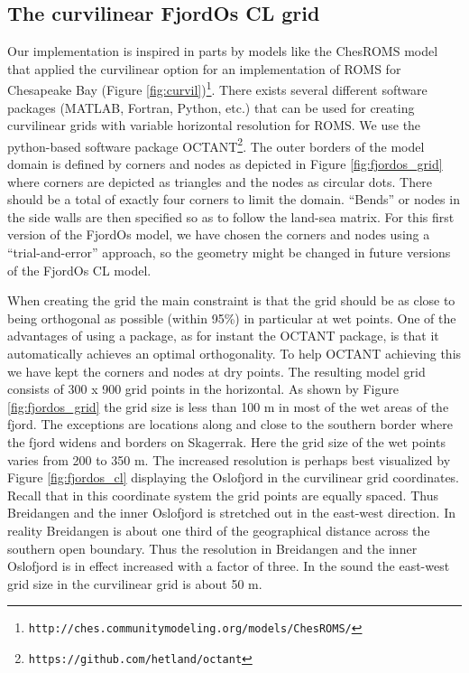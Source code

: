 \subsection{The curvilinear FjordOs CL grid}
Our implementation is inspired in parts by models like the ChesROMS model that applied the curvilinear option for an implementation of ROMS for Chesapeake Bay (Figure \ref{fig:curvil})\footnote{\texttt{http://ches.communitymodeling.org/models/ChesROMS/}}. There exists several different software packages (MATLAB, Fortran, Python, etc.) that can be used for creating curvilinear grids with variable horizontal resolution for ROMS. We use the python-based software package OCTANT\footnote{\texttt{https://github.com/hetland/octant}}. The outer borders of the model domain is defined by corners and nodes as depicted in Figure \ref{fig:fjordos_grid} where corners are depicted as triangles and the nodes as circular dots. There should be a total of exactly four corners to limit the domain. ``Bends'' or nodes in the side walls are then specified so as to follow the land-sea matrix. For this first version of the FjordOs model, we have chosen the corners and nodes using a ``trial-and-error'' approach, so the geometry might be changed in future versions of the FjordOs CL model.


When creating the grid the main constraint is that the grid should be as close to being orthogonal as possible (within 95\%) in particular at wet points. One of the advantages of using a package, as for instant the OCTANT package, is that it automatically achieves an optimal orthogonality. To help OCTANT achieving this we have kept the corners and nodes at dry points. The resulting model grid consists of 300 x 900 grid points in the horizontal. As shown by Figure \ref{fig:fjordos_grid} the grid size is less than 100 m in most of the wet areas of the fjord. The exceptions are locations along and close to the southern border where the fjord widens and borders on Skagerrak. Here the grid size of the wet points varies from 200 to 350 m. The increased resolution is perhaps best visualized by Figure \ref{fig:fjordos_cl} displaying the Oslofjord in the curvilinear grid coordinates. Recall that in this coordinate system the grid points are equally spaced. Thus Breidangen and the inner Oslofjord is stretched out in the east-west direction. In reality Breidangen is about one third of the geographical distance across the southern open boundary. Thus the resolution in Breidangen and the inner Oslofjord is in effect increased with a factor of three. In the {\DR} sound the east-west grid size in the curvilinear grid is about 50 m.  



